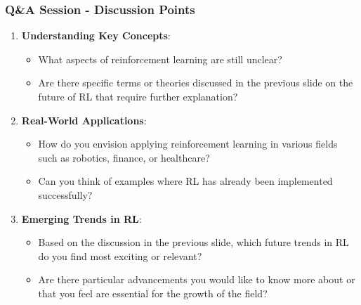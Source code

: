 \documentclass[aspectratio=169]{beamer}
\begin{document}
\begin{frame}[fragile]
    \frametitle{Q\&A Session - Discussion Points}
    \begin{enumerate}
        \item \textbf{Understanding Key Concepts}: 
            \begin{itemize}
                \item What aspects of reinforcement learning are still unclear? 
                \item Are there specific terms or theories discussed in the previous slide on the future of RL that require further explanation?
            \end{itemize}
        \item \textbf{Real-World Applications}: 
            \begin{itemize}
                \item How do you envision applying reinforcement learning in various fields such as robotics, finance, or healthcare?
                \item Can you think of examples where RL has already been implemented successfully?
            \end{itemize}
        \item \textbf{Emerging Trends in RL}: 
            \begin{itemize}
                \item Based on the discussion in the previous slide, which future trends in RL do you find most exciting or relevant?
                \item Are there particular advancements you would like to know more about or that you feel are essential for the growth of the field?
            \end{itemize}
    \end{enumerate}
\end{frame}
\end{document}
